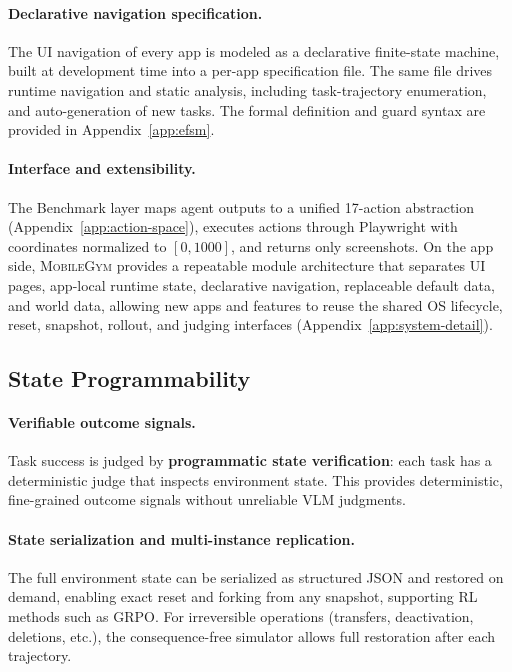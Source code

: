 \documentclass[11pt]{article}
\newcommand{\sys}{\textsc{MobileGym}}
\begin{document}
\paragraph{Declarative navigation specification.} The UI navigation of every app is modeled as a declarative finite-state machine, built at development time into a per-app specification file. The same file drives runtime navigation and static analysis, including task-trajectory enumeration, and auto-generation of new tasks. The formal definition and guard syntax are provided in Appendix~\ref{app:efsm}.

\paragraph{Interface and extensibility.} The Benchmark layer maps agent outputs to a unified 17-action abstraction (Appendix~\ref{app:action-space}), executes actions through Playwright with coordinates normalized to $[0,1000]$, and returns only screenshots. On the app side, \sys{} provides a repeatable module architecture that separates UI pages, app-local runtime state, declarative navigation, replaceable default data, and world data, allowing new apps and features to reuse the shared OS lifecycle, reset, snapshot, rollout, and judging interfaces (Appendix~\ref{app:system-detail}).

\subsection{State Programmability}\label{sec:system:state}

\paragraph{Verifiable outcome signals.} Task success is judged by \textbf{programmatic state verification}: each task has a deterministic judge that inspects environment state. This provides deterministic, fine-grained outcome signals without unreliable VLM judgments.

\paragraph{State serialization and multi-instance replication.} The full environment state can be serialized as structured JSON and restored on demand, enabling exact reset and forking from any snapshot, supporting RL methods such as GRPO. For irreversible operations (transfers, deactivation, deletions, etc.), the consequence-free simulator allows full restoration after each trajectory.
\end{document}
